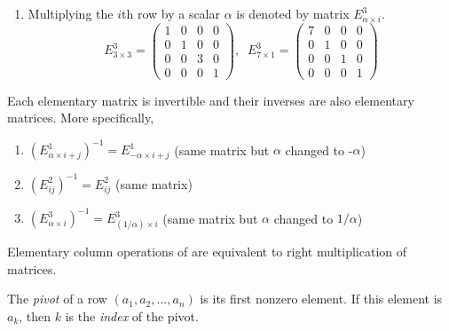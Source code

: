 \documentclass{article}
\begin{document}
\begin{definition}
\begin{enumerate}
        \item Multiplying the $i$th row by a scalar $\alpha$ is denoted by matrix $E^3_{\alpha \times i}$. 
        \begin{equation}
          E^3_{3 \times 3} = \begin{pmatrix}
          1&0&0&0 \\ 0&1&0&0 \\ 0&0&3&0 \\ 0&0&0&1
          \end{pmatrix}, \;\; E^3_{7 \times 1} = \begin{pmatrix}
          7&0&0&0 \\ 0&1&0&0 \\ 0&0&1&0 \\ 0&0&0&1
          \end{pmatrix}
        \end{equation}
      \end{enumerate}
    \end{definition}


    \begin{proposition}
    Each elementary matrix is invertible and their inverses are also elementary matrices. More specifically, 
    \begin{enumerate}
        \item $(E^1_{\alpha \times i + j})^{-1} = E^1_{-\alpha \times i + j}$ (same matrix but $\alpha$ changed to -$\alpha$)
        \item $(E^2_{i j})^{-1} = E^2_{i j}$ (same matrix) 
        \item $(E^3_{\alpha \times i})^{-1} = E^{3}_{(1/\alpha) \times i}$ (same matrix but $\alpha$ changed to $1 / \alpha$)
    \end{enumerate}
    \end{proposition}

    Elementary column operations of are equivalent to right multiplication of matrices. 

    \begin{definition}
    The \textit{pivot} of a row $(a_1, a_2, ..., a_n)$ is its first nonzero element. If this element is $a_k$, then $k$ is the \textit{index} of the pivot. 
    \end{definition}
\end{document}
